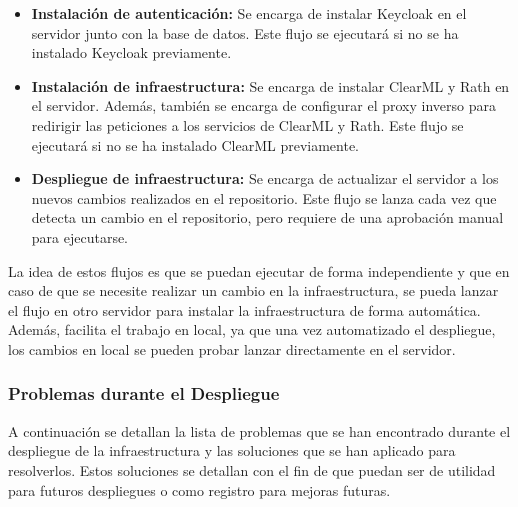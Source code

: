 \begin{itemize}
    \item \textbf{Instalación de autenticación:} Se encarga de instalar Keycloak
    en el servidor junto con la base de datos. Este flujo se ejecutará si no
    se ha instalado Keycloak previamente.
    \item \textbf{Instalación de infraestructura:} Se encarga de instalar ClearML y Rath
    en el servidor. Además, también se encarga de configurar el proxy inverso
    para redirigir las peticiones a los servicios de ClearML y Rath. Este flujo
    se ejecutará si no se ha instalado ClearML previamente.
    \item \textbf{Despliegue de infraestructura:} Se encarga de actualizar el
    servidor a los nuevos cambios realizados en el repositorio. Este flujo se
    lanza cada vez que detecta un cambio en el repositorio, pero requiere de
    una aprobación manual para ejecutarse.
\end{itemize}

La idea de estos flujos es que se puedan ejecutar de forma independiente
y que en caso de que se necesite realizar un cambio en la infraestructura,
se pueda lanzar el flujo en otro servidor para instalar la infraestructura
de forma automática. Además, facilita el trabajo en local, ya que una vez
automatizado el despliegue, los cambios en local se pueden probar lanzar
directamente en el servidor.

\subsubsection{Problemas durante el Despliegue}
A continuación se detallan la lista de problemas que se han encontrado durante
el despliegue de la infraestructura y las soluciones que se han aplicado para
resolverlos. Estos soluciones se detallan con el fin de que puedan ser de utilidad
para futuros despliegues o como registro para mejoras futuras.

